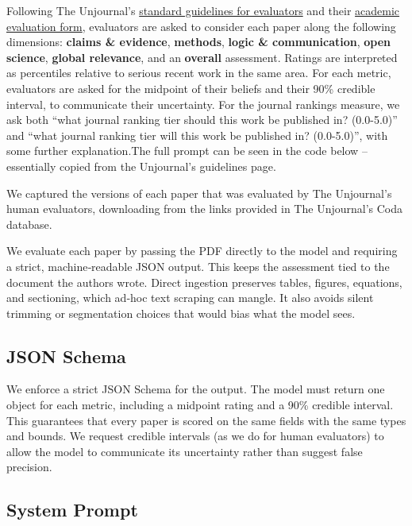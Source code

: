 \documentclass[
  11pt,
  letterpaper,
  DIV=11,
  numbers=noendperiod]{scrreprt}
\begin{document}
Following The Unjournal's
\href{https://globalimpact.gitbook.io/the-unjournal-project-and-communication-space/policies-projects-evaluation-workflow/evaluation/guidelines-for-evaluators}{standard
guidelines for evaluators} and their
\href{https://coda.io/form/Unjournal-Evaluation-form-academic-stream-Coda-updated-version_dGjfMZ1yXME}{academic
evaluation form}, evaluators are asked to consider each paper along the
following dimensions: \textbf{claims \& evidence}, \textbf{methods},
\textbf{logic \& communication}, \textbf{open science}, \textbf{global
relevance}, and an \textbf{overall} assessment. Ratings are interpreted
as percentiles relative to serious recent work in the same area. For
each metric, evaluators are asked for the midpoint of their beliefs and
their 90\% credible interval, to communicate their uncertainty. For the
journal rankings measure, we ask both ``what journal ranking tier should
this work be published in? (0.0-5.0)'' and ``what journal ranking tier
will this work be published in? (0.0-5.0)'', with some further
explanation.The full prompt can be seen in the code below -- essentially
copied from the Unjournal's guidelines page.

We captured the versions of each paper that was evaluated by The
Unjournal's human evaluators, downloading from the links provided in The
Unjournal's Coda database.

We evaluate each paper by passing the PDF directly to the model and
requiring a strict, machine‑readable JSON output. This keeps the
assessment tied to the document the authors wrote. Direct ingestion
preserves tables, figures, equations, and sectioning, which ad‑hoc text
scraping can mangle. It also avoids silent trimming or segmentation
choices that would bias what the model sees.

\subsection{JSON Schema}\label{json-schema}

We enforce a strict JSON Schema for the output. The model must return
one object for each metric, including a midpoint rating and a 90\%
credible interval. This guarantees that every paper is scored on the
same fields with the same types and bounds. We request credible
intervals (as we do for human evaluators) to allow the model to
communicate its uncertainty rather than suggest false precision.

\subsection{System Prompt}\label{system-prompt}
\end{document}
